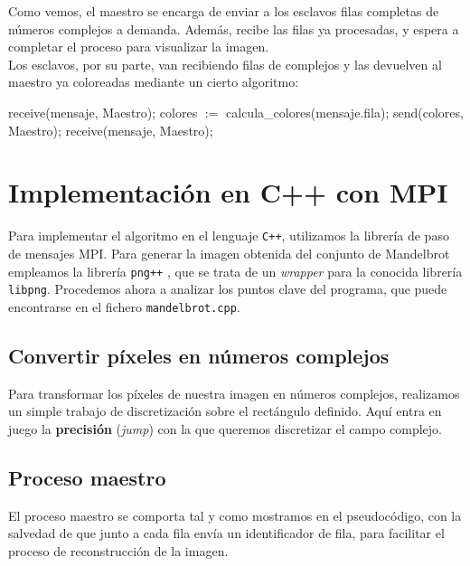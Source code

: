 \documentclass[11pt]{article}
\begin{document}
Como vemos, el maestro se encarga de enviar a los esclavos filas completas de números complejos a demanda. Además, recibe las filas ya procesadas, y espera a completar el proceso para visualizar la imagen.\\

Los esclavos, por su parte, van recibiendo filas de complejos y las devuelven al maestro ya coloreadas mediante un cierto algoritmo:

\begin{algorithm}
\begin{algorithmic}
     \State receive(mensaje, Maestro);
        \State colores $:=$ calcula\_colores(mensaje.fila);
         \State send(colores, Maestro);
          \State receive(mensaje, Maestro);
     \EndWhile
    \EndFunction
\end{algorithmic}
\end{algorithm}

\section*{Implementación en C++ con MPI}

Para implementar el algoritmo en el lenguaje \verb|C++|, utilizamos la librería de paso de mensajes MPI. Para generar la imagen obtenida del conjunto de Mandelbrot empleamos la librería \verb|png++| \cite{png++}, que se trata de un \textit{wrapper} para la conocida librería \verb|libpng|. Procedemos ahora a analizar los puntos clave del programa, que puede encontrarse en el fichero \verb|mandelbrot.cpp|.


\subsection*{Convertir píxeles en números complejos}

Para transformar los píxeles de nuestra imagen en números complejos, realizamos un simple trabajo de discretización sobre el rectángulo definido. Aquí entra en juego la \textbf{precisión} (\textit{jump}) con la que queremos discretizar el campo complejo.
\vspace{0.5em}



\subsection*{Proceso maestro}
El proceso maestro se comporta tal y como mostramos en el pseudocódigo, con la salvedad de que junto a cada fila envía un identificador de fila, para facilitar el proceso de reconstrucción de la imagen.
\vspace{0.5em}
\end{document}
